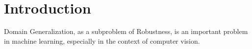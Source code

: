 \section{Introduction}

Domain Generalization, as a subproblem of Robustness, is an important problem in machine learning, especially in the context of computer vision.










